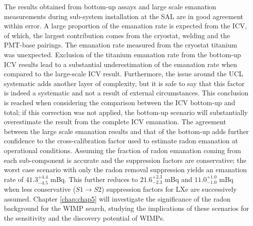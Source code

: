 The results obtained from bottom-up assays and large scale emanation measurements during sub-system installation at the SAL are in good agreement within error. A large proportion of the emanation rate is expected from the ICV, of which, the largest contribution comes from the cryostat, welding and the PMT-base pairings. The emanation rate measured from the cryostat titanium was unexpected. Exclusion of the titanium emanation rate from the bottom-up ICV results lead to a substantial underestimation of the emanation rate when compared to the large-scale ICV result. Furthermore, the issue around the UCL systematic adds another layer of complexity, but it is safe to say that this factor is indeed a systematic and not a result of external circumstances. This conclusion is reached when considering the comparison between the ICV bottom-up and total; if this correction was not applied, the bottom-up scenario will substantially overestimate the result from the complete ICV emanation. The agreement between the large scale emanation results and that of the bottom-up adds further confidence to the cross-calibration factor used to estimate radon emanation at operational conditions. Assuming the fraction of radon emanation coming from each sub-component is accurate and the suppression factors are conservative; the worst case scenario with only the radon removal suppression yields an emanation rate of $41.3^{+4.4}_{-4.5}$ mBq. This further reduces to $21.6^{+2.3}_{-2.3}$ mBq and $11.0^{+1.0}_{-1.0}$ mBq when less conservative ($S1\rightarrow{}S2$) suppression factors for LXe are successively assumed. Chapter \ref{chap:chap5} will investigate the significance of the radon background for the WIMP search, studying the implications of these scenarios for the sensitivity and the discovery potential of WIMPs.

